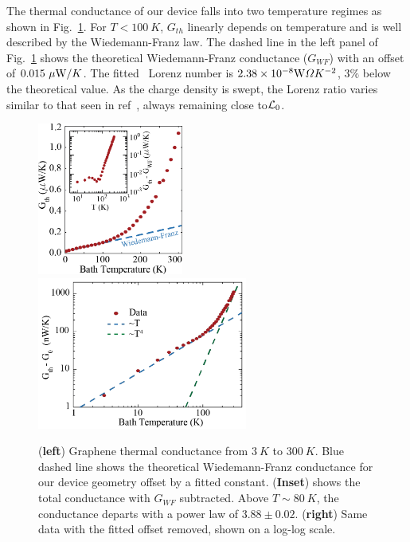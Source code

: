 The thermal conductance of our device falls into two temperature regimes as shown in Fig.~\ref{fig:Aria_Gth}. For $T<100~K$, $G_{th}$ linearly depends on temperature and is well described by the Wiedemann-Franz law. The dashed line in the left panel of Fig.~\ref{fig:Aria_Gth} shows the theoretical Wiedemann-Franz conductance ($G_{WF}$) with an offset of $0.015~\mu\mathrm{W}/K$. The fitted~\cite{fong_measurement_2013, yigen_wiedemannfranz_2014} Lorenz number is $2.38\times10^{-8} \mathrm{W}\Omega K^{-2}$, $3\%$ below the theoretical value. As the charge density is swept, the Lorenz ratio varies similar to that seen in ref~\cite{fong_measurement_2013}, always remaining close to$\mathcal{L}_0$.
\begin{figure}
\centering
\includegraphics[height=50mm, valign=t]{figures/high_density_graphene/Gth_lin.png}
\includegraphics[height=50mm, valign=t]{figures/high_density_graphene/Gth_log.png}
\caption{(\textbf{left}) Graphene thermal conductance from $3~K$ to $300~K$. Blue dashed line shows the theoretical Wiedemann-Franz conductance for our device geometry offset by a fitted constant. (\textbf{Inset}) shows the total conductance with $G_{WF}$ subtracted. Above $T\sim 80~K$, the conductance departs with a power law of $3.88 \pm 0.02$. (\textbf{right}) Same data with the fitted offset removed, shown on a log-log scale.}
\label{fig:Aria_Gth}
\end{figure}

